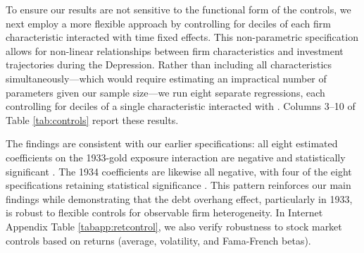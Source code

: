 To ensure our results are not sensitive to the functional form of the controls, we next employ a more flexible approach by controlling for deciles of each firm characteristic interacted with time fixed effects. This non-parametric specification allows for non-linear relationships between firm characteristics and investment trajectories during the Depression. Rather than including all characteristics simultaneously---which would require estimating an impractical number of parameters given our sample size---we run eight separate regressions, each controlling for deciles of a single characteristic interacted with . Columns 3--10 of Table \ref{tab:controls} report these results.

The findings are consistent with our earlier specifications: all eight estimated coefficients on the 1933-gold exposure interaction are negative and statistically significant . The 1934 coefficients are likewise all negative, with four of the eight specifications retaining statistical significance . This pattern reinforces our main findings while demonstrating that the debt overhang effect, particularly in 1933, is robust to flexible controls for observable firm heterogeneity. In Internet Appendix Table \ref{tabapp:retcontrol}, we also verify robustness to stock market controls based on  returns (average, volatility, and Fama-French betas). 

